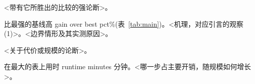 \begin{finding}
\label{find:main}
\sys{} <带有它所胜出的比较的强论断>。
\end{finding}
\sys{} 比最强的基线高 \num{gain over best pct}\%(表~\ref{tab:main})。<机理，对应引言的观察 (1)>。<边界情形及其实测原因>。

\begin{finding}
\label{find:cost}
<关于代价或规模的论断>。
\end{finding}
\sys{} 在最大的表上用时 \num{runtime minutes} 分钟。<哪一步占主要开销，随规模如何增长>。
